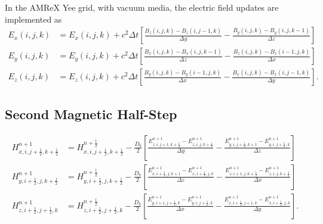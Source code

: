 \documentclass{article}
\numberwithin{equation}{section}
\numberwithin{figure}{section}
\begin{document}
In the AMReX Yee grid, with vacuum media, the electric field updates are implemented as
\begin{subequations}\label{eq:fdtd-e-full-amrex}
    \begin{align}
        E_x(i,j,k) & = E_x(i,j,k) + c^2 \Delta t \left[\frac{B_z(i,j,k)-B_z(i,j-1,k)}{\Delta y} - \frac{B_y(i,j,k)-B_y(i,j,k-1)}{\Delta z}\right]  \\
        E_y(i,j,k) & = E_y(i,j,k) + c^2 \Delta t \left[\frac{B_x(i,j,k)-B_x(i,j,k-1)}{\Delta z} - \frac{B_z(i,j,k)-B_z(i-1,j,k)}{\Delta x}\right]  \\
        E_z(i,j,k) & = E_z(i,j,k) + c^2 \Delta t \left[\frac{B_y(i,j,k)-B_y(i-1,j,k)}{\Delta x} - \frac{B_x(i,j,k)-B_x(i,j-1,k)}{\Delta y}\right].
    \end{align}
\end{subequations}

\subsection{Second Magnetic Half-Step}
\begin{subequations}\label{eq:fdtd-second-h-half}
    \begin{align}
        H_{x,i,j+\frac{1}{2},k+\frac{1}{2}}^{n+1} & = H_{x,i,j+\frac{1}{2},k+\frac{1}{2}}^{n+\frac{1}{2}} - \frac{D_b}{2} \left[\frac{E_{z,i,j+1,k+\frac{1}{2}}^{n+1}-E_{z,i,j,k+\frac{1}{2}}^{n+1}}{\Delta y} - \frac{E_{y,i,j+\frac{1}{2},k+1}^{n+1}-E_{y,i,j+\frac{1}{2},k}^{n+1}}{\Delta z}\right]
        \label{eq:fdtd-second-hx}                                                                                                                                                                                                                                                                       \\
        H_{y,i+\frac{1}{2},j,k+\frac{1}{2}}^{n+1} & = H_{y,i+\frac{1}{2},j,k+\frac{1}{2}}^{n+\frac{1}{2}} - \frac{D_b}{2} \left[\frac{E_{x,i+\frac{1}{2},j,k+1}^{n+1}-E_{x,i+\frac{1}{2},j,k}^{n+1}}{\Delta z} - \frac{E_{z,i+1,j,k+\frac{1}{2}}^{n+1}-E_{z,i,j,k+\frac{1}{2}}^{n+1}}{\Delta x}\right]
        \label{eq:fdtd-second-hy}                                                                                                                                                                                                                                                                       \\
        H_{z,i+\frac{1}{2},j+\frac{1}{2},k}^{n+1} & = H_{z,i+\frac{1}{2},j+\frac{1}{2},k}^{n+\frac{1}{2}} - \frac{D_b}{2} \left[\frac{E_{y,i+1,j+\frac{1}{2},k}^{n+1}-E_{y,i,j+\frac{1}{2},k}^{n+1}}{\Delta x} - \frac{E_{x,i+\frac{1}{2},j+1,k}^{n+1}-E_{x,i+\frac{1}{2},j,k}^{n+1}}{\Delta y}\right].
        \label{eq:fdtd-second-hz}
    \end{align}
\end{subequations}
\end{document}
